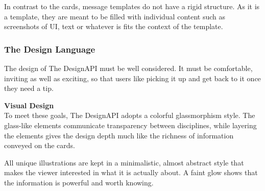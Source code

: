 In contrast to the cards, message templates do not have a rigid structure. As it is a template, they
are meant to be filled with individual content such as screenshots of UI, text or whatever is fits
the context of the template.

\subsubsection{The Design Language}


% 


The design of The DesignAPI must be well considered. It must be comfortable, inviting as well as
exciting, so that users like picking it up and get back to it once they need a tip.

\textbf{Visual Design}\\
To meet these goals, The DesignAPI adopts a colorful glassmorphism style. The glass-like elements
communicate transparency between disciplines, while layering the elements gives the design depth
much like the richness of information conveyed on the cards.

All unique illustrations are kept in a minimalistic, almost abstract style that makes the viewer
interested in what it is actually about. A faint glow shows that the information is powerful and
worth knowing.

